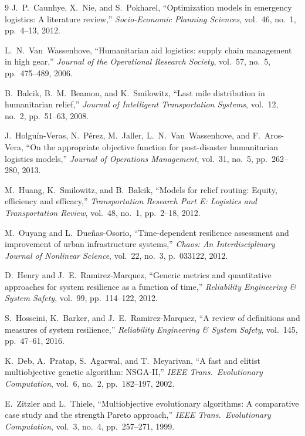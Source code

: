 \documentclass[10pt,conference,letterpaper]{IEEEtran}
\begin{document}
\begin{thebibliography}{9}
J.~P.~Caunhye, X.~Nie, and S.~Pokharel, ``Optimization models in
emergency logistics: A literature review,''
\emph{Socio-Economic Planning Sciences}, vol.~46, no.~1, pp.~4--13, 2012.

L.~N.~Van~Wassenhove, ``Humanitarian aid logistics: supply chain
management in high gear,''
\emph{Journal of the Operational Research Society}, vol.~57, no.~5,
pp.~475--489, 2006.

B.~Balcik, B.~M.~Beamon, and K.~Smilowitz, ``Last mile distribution in
humanitarian relief,''
\emph{Journal of Intelligent Transportation Systems}, vol.~12, no.~2,
pp.~51--63, 2008.

J.~Holgu{\'i}n-Veras, N.~P{\'e}rez, M.~Jaller, L.~N.~Van~Wassenhove, and
F.~Aros-Vera, ``On the appropriate objective function for post-disaster
humanitarian logistics models,''
\emph{Journal of Operations Management}, vol.~31, no.~5, pp.~262--280,
2013.

M.~Huang, K.~Smilowitz, and B.~Balcik, ``Models for relief routing:
Equity, efficiency and efficacy,''
\emph{Transportation Research Part E: Logistics and Transportation
Review}, vol.~48, no.~1, pp.~2--18, 2012.

M.~Ouyang and L.~Due{\~n}as-Osorio, ``Time-dependent resilience assessment
and improvement of urban infrastructure systems,''
\emph{Chaos: An Interdisciplinary Journal of Nonlinear Science},
vol.~22, no.~3, p.~033122, 2012.

D.~Henry and J.~E.~Ramirez-Marquez, ``Generic metrics and quantitative
approaches for system resilience as a function of time,''
\emph{Reliability Engineering \& System Safety}, vol.~99, pp.~114--122,
2012.

S.~Hosseini, K.~Barker, and J.~E.~Ramirez-Marquez, ``A review of
definitions and measures of system resilience,''
\emph{Reliability Engineering \& System Safety}, vol.~145, pp.~47--61,
2016.

K.~Deb, A.~Pratap, S.~Agarwal, and T.~Meyarivan, ``A fast and elitist
multiobjective genetic algorithm: NSGA-II,''
\emph{IEEE Trans.\ Evolutionary Computation}, vol.~6, no.~2,
pp.~182--197, 2002.

E.~Zitzler and L.~Thiele, ``Multiobjective evolutionary algorithms: A
comparative case study and the strength Pareto approach,''
\emph{IEEE Trans.\ Evolutionary Computation}, vol.~3, no.~4,
pp.~257--271, 1999.


\end{thebibliography}
\end{document}
